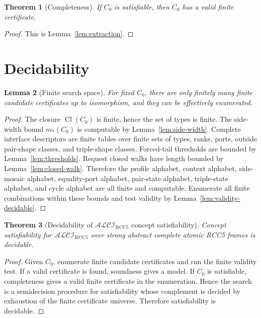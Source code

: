 \documentclass[11pt]{article}
\newtheorem{theorem}{Theorem}[section]
\newtheorem{lemma}[theorem]{Lemma}
\newcommand{\Logic}{\mathcal{ALCI}_{\mathrm{RCC5}}}
\newcommand{\Cl}{\operatorname{Cl}}
\begin{document}
\begin{theorem}[Completeness]
If $C_0$ is satisfiable, then $C_0$ has a valid finite certificate.
\end{theorem}

\begin{proof}
This is Lemma~\ref{lem:extraction}.
\end{proof}

\section{Decidability}

\begin{lemma}[Finite search space]
For fixed $C_0$, there are only finitely many finite candidate certificates up to isomorphism, and they can be effectively enumerated.
\end{lemma}

\begin{proof}
The closure $\Cl(C_0)$ is finite, hence the set of types is finite.  The side-width bound $m_*(C_0)$ is computable by Lemma~\ref{lem:side-width}.  Complete interface descriptors are finite tables over finite sets of types, ranks, ports, outside pair-shape classes, and triple-shape classes.  Forced-tail thresholds are bounded by Lemma~\ref{lem:thresholds}.  Request closed walks have length bounded by Lemma~\ref{lem:closed-walk}.  Therefore the profile alphabet, context alphabet, side-mosaic alphabet, equality-port alphabet, pair-state alphabet, triple-state alphabet, and cycle alphabet are all finite and computable.  Enumerate all finite combinations within these bounds and test validity by Lemma~\ref{lem:validity-decidable}.
\end{proof}

\begin{theorem}[Decidability of $\Logic$ concept satisfiability]
Concept satisfiability for $\Logic$ over strong abstract complete atomic RCC5 frames is decidable.
\end{theorem}

\begin{proof}
Given $C_0$, enumerate finite candidate certificates and run the finite validity test.  If a valid certificate is found, soundness gives a model.  If $C_0$ is satisfiable, completeness gives a valid finite certificate in the enumeration.  Hence the search is a semidecision procedure for satisfiability whose complement is decided by exhaustion of the finite certificate universe.  Therefore satisfiability is decidable.
\end{proof}
\end{document}
